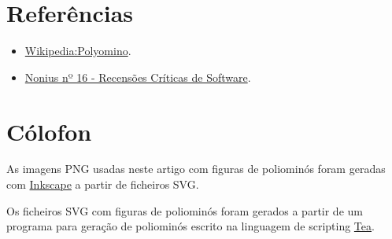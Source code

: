 \documentclass[11pt]{article}
\begin{document}
\section*{Referências}

\begin{itemize}

\item \href{http://en.wikipedia.org/wiki/Polyomino}{Wikipedia:Polyomino}.

\item
  \href{http://www.mat.uc.pt/~jaimecs/nonius/nonius16_1.html}{Nonius
    nº 16 - Recensões Críticas de Software}.

\end{itemize}





\section*{Cólofon}

As imagens PNG usadas neste artigo com figuras de poliominós foram
geradas com \href{http://www.inkscape.org/}{Inkscape} a partir de
ficheiros SVG.

Os ficheiros SVG com figuras de poliominós foram gerados a partir de
um programa para geração de poliominós escrito na linguagem de
scripting \href{http://www.pdmfc.com/tea-site/info/index.html}{Tea}.
\end{document}
